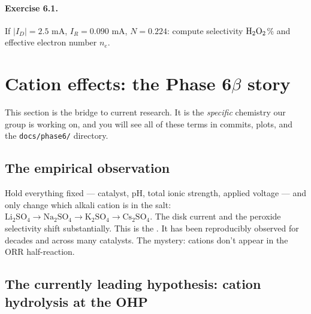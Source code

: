 \documentclass[11pt]{article}
\begin{document}
\begin{center}
\end{center}

\paragraph{Exercise 6.1.} If $|I_D| = 2.5$ mA, $I_R = 0.090$ mA,
$N = 0.224$: compute selectivity $\mathrm{H_2O_2}$\% and effective
electron number $n_e$.

\section{Cation effects: the Phase 6$\beta$ story}

This section is the bridge to current research. It is the
\textit{specific} chemistry our group is working on, and you will
see all of these terms in commits, plots, and the
\texttt{docs/phase6/} directory.

\subsection{The empirical observation}

Hold everything fixed --- catalyst, pH, total ionic strength, applied
voltage --- and only change which alkali cation is in the salt:
$\mathrm{Li_2SO_4} \to \mathrm{Na_2SO_4} \to \mathrm{K_2SO_4} \to
\mathrm{Cs_2SO_4}$. The disk current and the peroxide selectivity
shift substantially. This is the . It has
been reproducibly observed for decades and across many catalysts. The
mystery: cations don't appear in the ORR half-reaction.

\subsection{The currently leading hypothesis: cation hydrolysis at
                                              the OHP}
\end{document}
